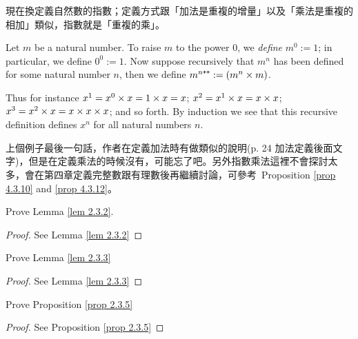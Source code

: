 \begin{note}
現在換定義自然數的指數；定義方式跟「加法是重複的增量」以及「乘法是重複的相加」類似，指數就是「重複的乘」。
\end{note}

\begin{definition} \label{def 2.3.11}
Let \(m\) be a natural number. To raise \(m\) to the power \(0\), we \emph{define} \(m^0 := 1\); in particular, we define \(0^0 := 1\). Now suppose recursively that \(m^n\) has been defined for some natural number \(n\), then we define \(m^{n\texttt{++}} := (m^n \times m)\).
\end{definition}

\begin{example}\label{example 2.3.12}
Thus for instance \(x^1 = x^0 \times x = 1 \times x = x\); \(x^2 = x^1 \times x = x \times x\); \(x^3 = x^2 \times x = x \times x \times x\); and so forth. By induction we see that this recursive definition defines \(x^n\) for all natural numbers \(n\).
\end{example}
\begin{note}
上個例子最後一句話，作者在定義加法時有做類似的說明(p. 24 加法定義後面文字)，但是在定義乘法的時候沒有，可能忘了吧。另外指數乘法這裡不會探討太多，會在第四章定義完整數跟有理數後再繼續討論，可參考\ Proposition \ref{prop 4.3.10} and \ref{prop 4.3.12}。
\end{note}

\exercisesection

\begin{exercise}\label{exercise 2.3.1}
    Prove Lemma \ref{lem 2.3.2}.
\end{exercise}
\begin{proof}
    See Lemma \ref{lem 2.3.2}
\end{proof}

\begin{exercise}\label{exercise 2.3.2}
    Prove Lemma \ref{lem 2.3.3}
\end{exercise}
\begin{proof}
    See Lemma \ref{lem 2.3.3}
\end{proof}

\begin{exercise}\label{exercise 2.3.3}
    Prove Proposition \ref{prop 2.3.5}
\end{exercise}
\begin{proof}
    See Proposition \ref{prop 2.3.5}
\end{proof}

